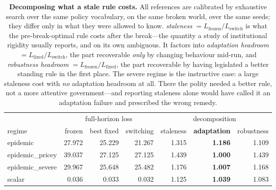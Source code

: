 \begin{table}[t]\centering\small
\caption{\textbf{Decomposing what a stale rule costs.} All references are calibrated by
exhaustive search over the same policy vocabulary, on the same broken world, over the same seeds;
they differ only in what they were allowed to know. \emph{staleness}
$=L_{\text{frozen}}/L_{\text{switch}}$ is what the pre-break-optimal rule costs after the
break---the quantity a study of institutional rigidity usually reports, and on its own ambiguous.
It factors into \emph{adaptation headroom} $=L_{\text{fixed}}/L_{\text{switch}}$, the
part recoverable \emph{only} by changing behaviour mid-run, and \emph{robustness headroom}
$=L_{\text{frozen}}/L_{\text{fixed}}$, the part recoverable by having legislated a better
standing rule in the first place. The severe regime is the instructive case: a large staleness cost
with \emph{no} adaptation headroom at all. There the polity needed a better rule, not a more
attentive government---and reporting staleness alone would have called it an adaptation failure and
prescribed the wrong remedy.}
\label{tab:headroom}
\begin{tabular}{@{}l r r r r r r@{}}
\toprule
& \multicolumn{3}{c}{full-horizon loss} & \multicolumn{3}{c}{decomposition} \\
\cmidrule(lr){2-4} \cmidrule(lr){5-7}
regime & frozen & best fixed & switching & staleness & \textbf{adaptation} & robustness \\
\midrule
epidemic & 27.972 & 25.229 & 21.267 & 1.315 & \textbf{1.186} & 1.109 \\
epidemic\_pricey & 39.037 & 27.125 & 27.125 & 1.439 & \textbf{1.000} & 1.439 \\
epidemic\_severe & 29.967 & 25.648 & 25.482 & 1.176 & \textbf{1.007} & 1.168 \\
scalar & 0.036 & 0.033 & 0.032 & 1.125 & \textbf{1.039} & 1.083 \\
\bottomrule
\end{tabular}
\end{table}
